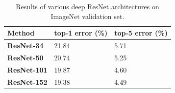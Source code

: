 \begin{table}[]
\centering
\caption{Results of various deep ResNet architectures on ImageNet validation set.}
\label{tab:deepresimagenet}
\begin{tabular}{|l|l|l|}
\hline
\textbf{Method}     & \textbf{top-1 error (\%)} & \textbf{top-5 error (\%)} \\ \hline
\textbf{ResNet-34}  & 21.84            & 5.71             \\ \hline
\textbf{ResNet-50}  & 20.74            & 5.25             \\ \hline
\textbf{ResNet-101} & 19.87            & 4.60             \\ \hline
\textbf{ResNet-152} & 19.38            & 4.49             \\ \hline
\end{tabular}
\end{table}

